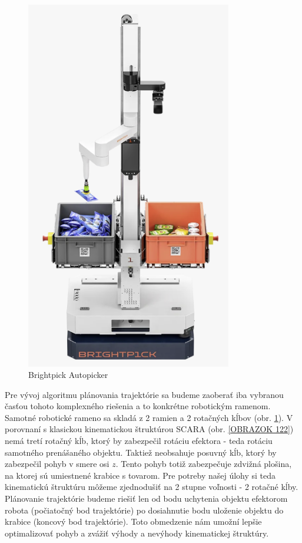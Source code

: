 \begin{figure}[h!]
	\centering
	\includegraphics[width=90mm]{img/autopicker.png}
	\caption{Brightpick Autopicker }\label{OBRAZOK 1.2.1} 
\end{figure} 

Pre vývoj algoritmu plánovania trajektórie sa budeme zaoberať iba vybranou časťou tohoto komplexného riešenia a to konkrétne robotickým ramenom. Samotné robotické rameno sa skladá z 2 ramien a 2 rotačných kĺbov (obr. \ref{OBRAZOK 1.2.1}).  V porovnaní s klasickou kinematickou štruktúrou SCARA (obr. \ref{OBRAZOK 122}) nemá tretí rotačný kĺb, ktorý by zabezpečil rotáciu efektora - teda rotáciu samotného prenášaného objektu. Taktiež neobsahuje posuvný kĺb, ktorý by zabezpečil pohyb v smere osi $z$. Tento pohyb totiž zabezpečuje zdvižná plošina, na ktorej sú umiestnené krabice s tovarom. Pre potreby našej úlohy si teda kinematickú štruktúru môžeme zjednodušiť na 2 stupne voľnosti - 2 rotačné kĺby. Plánovanie trajektórie budeme riešiť len od bodu uchytenia objektu efektorom robota (počiatočný bod trajektórie) po dosiahnutie bodu uloženie objektu do krabice (koncový bod trajektórie). Toto obmedzenie nám umožní lepšie optimalizovať pohyb a zvážiť výhody a nevýhody kinematickej štruktúry.


